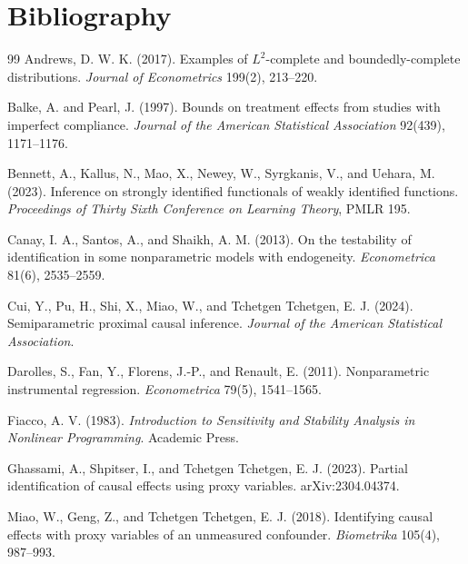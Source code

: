 \documentclass[11pt]{article}
\theoremstyle{definition}
\theoremstyle{plain}
\theoremstyle{remark}
\begin{document}
\section*{Bibliography}
\begin{thebibliography}{99}
Andrews, D. W. K. (2017).
Examples of \(L^2\)-complete and boundedly-complete distributions.
\textit{Journal of Econometrics} 199(2), 213--220.

Balke, A. and Pearl, J. (1997).
Bounds on treatment effects from studies with imperfect compliance.
\textit{Journal of the American Statistical Association} 92(439), 1171--1176.

Bennett, A., Kallus, N., Mao, X., Newey, W., Syrgkanis, V., and Uehara, M. (2023).
Inference on strongly identified functionals of weakly identified functions.
\textit{Proceedings of Thirty Sixth Conference on Learning Theory}, PMLR 195.

Canay, I. A., Santos, A., and Shaikh, A. M. (2013).
On the testability of identification in some nonparametric models with endogeneity.
\textit{Econometrica} 81(6), 2535--2559.

Cui, Y., Pu, H., Shi, X., Miao, W., and Tchetgen Tchetgen, E. J. (2024).
Semiparametric proximal causal inference.
\textit{Journal of the American Statistical Association}.

Darolles, S., Fan, Y., Florens, J.-P., and Renault, E. (2011).
Nonparametric instrumental regression.
\textit{Econometrica} 79(5), 1541--1565.

Fiacco, A. V. (1983).
\textit{Introduction to Sensitivity and Stability Analysis in Nonlinear Programming}.
Academic Press.

Ghassami, A., Shpitser, I., and Tchetgen Tchetgen, E. J. (2023).
Partial identification of causal effects using proxy variables.
arXiv:2304.04374.

Miao, W., Geng, Z., and Tchetgen Tchetgen, E. J. (2018).
Identifying causal effects with proxy variables of an unmeasured confounder.
\textit{Biometrika} 105(4), 987--993.


\end{thebibliography}
\end{document}
